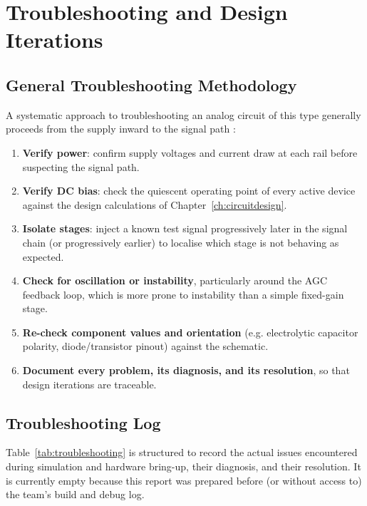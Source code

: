 \chapter{Troubleshooting and Design Iterations}
\label{ch:troubleshooting}

\section{General Troubleshooting Methodology}

A systematic approach to troubleshooting an analog circuit of this type generally proceeds from the supply inward to the signal path \cite{ref1,ref4}:
\begin{enumerate}
    \item \textbf{Verify power}: confirm supply voltages and current draw at each rail before suspecting the signal path.
    \item \textbf{Verify DC bias}: check the quiescent operating point of every active device against the design calculations of Chapter~\ref{ch:circuitdesign}.
    \item \textbf{Isolate stages}: inject a known test signal progressively later in the signal chain (or progressively earlier) to localise which stage is not behaving as expected.
    \item \textbf{Check for oscillation or instability}, particularly around the AGC feedback loop, which is more prone to instability than a simple fixed-gain stage.
    \item \textbf{Re-check component values and orientation} (e.g. electrolytic capacitor polarity, diode/transistor pinout) against the schematic.
    \item \textbf{Document every problem, its diagnosis, and its resolution}, so that design iterations are traceable.
\end{enumerate}

\section{Troubleshooting Log}

Table~\ref{tab:troubleshooting} is structured to record the actual issues encountered during simulation and hardware bring-up, their diagnosis, and their resolution. It is currently empty because this report was prepared before (or without access to) the team's build and debug log.



